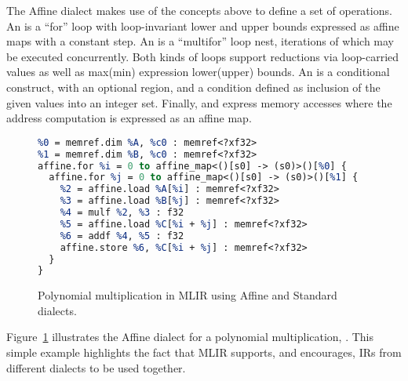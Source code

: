 The Affine dialect makes use of the concepts above to define a set of operations.
An  is a ``for'' loop with loop-invariant lower and upper bounds expressed as affine maps with a constant step.
An  is a ``multifor'' loop nest, iterations of which may be executed concurrently.
Both kinds of loops support reductions via loop-carried values as well as max(min) expression lower(upper) bounds.
An  is a conditional construct, with an optional  region, and a condition defined as inclusion of the given values into an integer set.
Finally,  and  express memory accesses where the address computation is expressed as an affine map.

\begin{figure}
{
\scriptsize
\begin{lstlisting}[language=llvm, escapeinside=@@, mathescape=true]
%c0 = constant 0 : index
%0 = memref.dim %A, %c0 : memref<?xf32>
%1 = memref.dim %B, %c0 : memref<?xf32>
affine.for %i = 0 to affine_map<()[s0] -> (s0)>()[%0] {
  affine.for %j = 0 to affine_map<()[s0] -> (s0)>()[%1] {
    %2 = affine.load %A[%i] : memref<?xf32>
    %3 = affine.load %B[%j] : memref<?xf32>
    %4 = mulf %2, %3 : f32
    %5 = affine.load %C[%i + %j] : memref<?xf32>
    %6 = addf %4, %5 : f32
    affine.store %6, %C[%i + %j] : memref<?xf32>
  }
}
\end{lstlisting}
}
\vspace{-.5cm}
\caption{Polynomial multiplication in MLIR using Affine and Standard dialects.}
\label{fig:polynomial}
\end{figure}

Figure~\ref{fig:polynomial} illustrates the Affine dialect for a polynomial multiplication, .
This simple example highlights the fact that MLIR supports, and encourages, IRs from different dialects to be used together.


